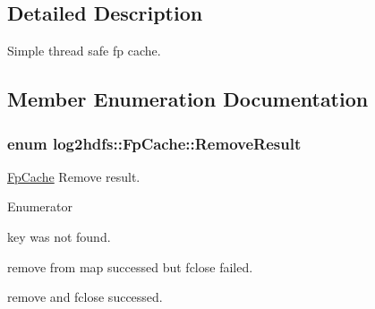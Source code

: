 \subsection{Detailed Description}
Simple thread safe fp cache. 

\subsection{Member Enumeration Documentation}
\subsubsection[{\texorpdfstring{Remove\+Result}{RemoveResult}}]{\setlength{\rightskip}{0pt plus 5cm}enum {\bf log2hdfs\+::\+Fp\+Cache\+::\+Remove\+Result}}\hypertarget{classlog2hdfs_1_1FpCache_a5a925c5b356be91cf262e5219dafdabe}{}\label{classlog2hdfs_1_1FpCache_a5a925c5b356be91cf262e5219dafdabe}
\hyperlink{classlog2hdfs_1_1FpCache}{Fp\+Cache} Remove result. \begin{Desc}
\item[Enumerator]\par
\begin{description}
\item[{\em 
k\+Invalid\+Key\hypertarget{classlog2hdfs_1_1FpCache_a5a925c5b356be91cf262e5219dafdabea45c149a2991a004cc2f703028ee8f743}{}\label{classlog2hdfs_1_1FpCache_a5a925c5b356be91cf262e5219dafdabea45c149a2991a004cc2f703028ee8f743}
}]key was not found. \item[{\em 
k\+Remove\+Failed\hypertarget{classlog2hdfs_1_1FpCache_a5a925c5b356be91cf262e5219dafdabea85a0c35bd500ce91be5a049be1e42b82}{}\label{classlog2hdfs_1_1FpCache_a5a925c5b356be91cf262e5219dafdabea85a0c35bd500ce91be5a049be1e42b82}
}]remove from map successed but fclose failed. \item[{\em 
k\+Remove\+Ok\hypertarget{classlog2hdfs_1_1FpCache_a5a925c5b356be91cf262e5219dafdabea9fbf001dccee023203b54359e8928193}{}\label{classlog2hdfs_1_1FpCache_a5a925c5b356be91cf262e5219dafdabea9fbf001dccee023203b54359e8928193}
}]remove and fclose successed. \end{description}
\end{Desc}


